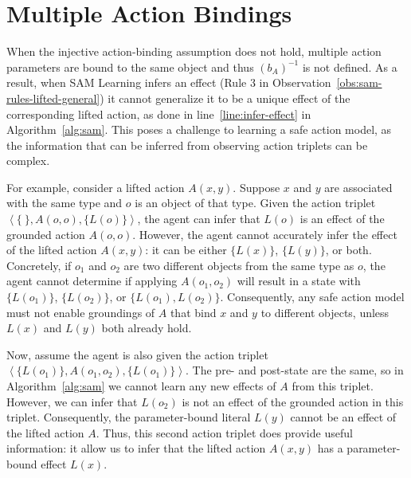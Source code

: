 \documentclass{article}
\newcommand{\tuple}[1]{\ensuremath{\left \langle #1 \right \rangle }}
\newcommand{\liftl}{L}
\newcommand{\lifta}{A}
\begin{document}
\section{Multiple Action Bindings}
When the injective action-binding assumption does not hold, 
multiple action parameters are bound to the same object and thus $(b_\lifta)^{-1}$ is not defined. 
As a result, when SAM Learning infers an effect (Rule 3 in Observation~\ref{obs:sam-rules-lifted-general}) it cannot generalize it to be a unique effect of the corresponding lifted action, as done in line~\ref{line:infer-effect} in Algorithm~\ref{alg:sam}. 
This poses a challenge to learning a safe action model, as the information that can be inferred from observing action triplets can be complex.

For example,
consider a lifted action $\lifta(x,y)$.  
Suppose $x$ and $y$ are associated with the same type and $o$ is an object of that type. 
Given the action triplet 
$\tuple{\{~\}, \lifta(o, o), \{\liftl(o)\}}$, 
the agent can infer that $\liftl(o)$ is an effect of the grounded action $\lifta(o, o)$. 
However, the agent cannot accurately infer the effect of the lifted action $\lifta(x,y)$: it can be
 either $\{\liftl(x)\}$, $\{\liftl(y)\}$, or both. 
 Concretely, if $o_1$ and $o_2$ are two different objects from the same type as $o$, 
 the agent cannot determine if applying $\lifta(o_1,o_2)$ will result in a state with
 $\{\liftl(o_1)\}$, $\{\liftl(o_2)\}$, or $\{\liftl(o_1), \liftl(o_2)\}$.
Consequently, any safe action model must not enable groundings of $\lifta$ that bind $x$ and $y$ to different objects, unless $L(x)$ and $L(y)$ both already hold. 

Now, assume the agent is also given the action triplet 
$\tuple{\{\liftl(o_1)\}, \lifta(o_1, o_2), \{\liftl(o_1)\}}$. 
The pre- and post-state are the same, so in Algorithm~\ref{alg:sam} we cannot learn any new effects of $\lifta$ from this triplet. However, we can infer that $\liftl(o_2)$ is not an effect of the grounded action in this triplet. Consequently, the parameter-bound literal $\liftl(y)$ cannot be an effect of the lifted action $\lifta$. 
Thus, this second action triplet does provide useful information: it allow us to infer that 
the lifted action $\lifta(x,y)$ has a parameter-bound effect $\liftl(x)$. 
\end{document}

